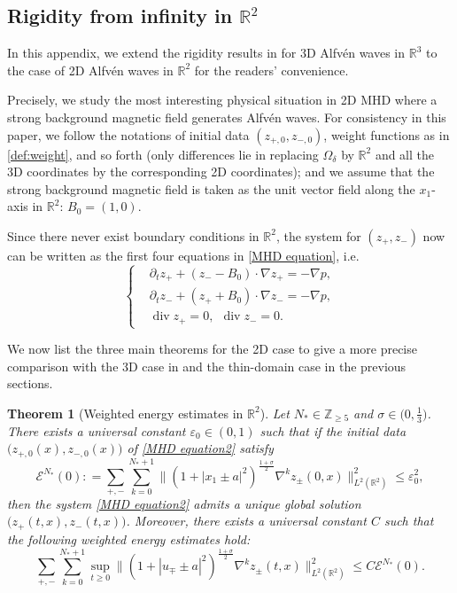 \documentclass[10pt,reqno]{amsart}
\numberwithin{equation}{section}
\newtheorem{theorem}{Theorem}[section]
\begin{document}
\begin{appendix}
	\section{Rigidity from infinity in $\mathbb{R}^2$}
	
	In this appendix, we extend the rigidity results in \cite{Li-Yu} for 3D Alfv\'en waves in $\mathbb{R}^3$  to the case of 2D Alfv\'en waves in $\mathbb{R}^2$ for the readers' convenience. 
	
	Precisely, we study the most interesting physical situation in 2D MHD where a strong background magnetic field generates Alfv\'en waves. For consistency in 
	this paper, we follow the notations of initial data $(z_{+,0},z_{-,0})$, weight functions as in \eqref{def:weight}, and so forth (only differences lie  in replacing $\Omega_\delta$ by $\mathbb{R}^2$ and all the 3D coordinates by the corresponding 2D coordinates); and we  
	assume that the strong background  magnetic field is taken as the unit vector field along the $x_1$-axis in $\mathbb{R}^2$: $B_0=(1,0)$.  
	
	Since there never exist boundary conditions in $\mathbb{R}^2$, the system for $(z_+,z_-)$ now can be written as the first four equations in \eqref{MHD equation}, i.e. 
	\begin{equation}\label{MHD equation2}\begin{cases}
			&\partial_{t}z_{+}+(z_--B_0)\cdot \nabla z_{+} =-\nabla p,\\
			&\partial_{t}z_{-}+(z_++B_0)\cdot \nabla z_{-} =-\nabla p,\\
			&\operatorname{div} z_{+}=0,\ \
			\operatorname{div} z_{-}=0.
	\end{cases}\end{equation}
	
We now list the three main theorems for the 2D case to give a more precise comparison with the 3D case in \cite{Li-Yu} and the thin-domain case in the previous sections.
	\begin{theorem}[Weighted energy estimates in $\mathbb{R}^2$]\label{Main Energy Estimates MHD 2d}  Let $N_* \in \mathbb{Z}_{\geqslant 5}$ and $\sigma \in\big(0,\frac{1}{3}\big)$. There exists a universal constant $\varepsilon_0\in(0,1)$ such that if the initial data $\big(z_{+,0}(x),z_{-,0}(x)\big)$ of \eqref{MHD equation2} satisfy
		\begin{equation*}
			\mathcal{E}^{N_*}(0): =\sum_{+,-}\sum_{k=0}^{N_*+1}\Big\|\left(1+|x_1\pm a|^2\right)^{\frac{1+\sigma}{2}}\nabla^{k} z_{\pm}(0,x)\Big\|_{L^2(\mathbb{R}^2)}^2\leqslant\varepsilon_0^2,
		\end{equation*}
		then the system \eqref{MHD equation2} admits a unique global solution  $\big(z_+(t,x),z_-(t,x)\big)$. Moreover, there exists a universal constant $C$ such that the following weighted energy estimates hold:
		\begin{equation*}
			\sum_{+,-}\sum_{k=0}^{N_*+1}\sup_{t\geqslant 0}\Big\|\left(1+|u_\mp \pm a|^2\right)^{\frac{1+\sigma}{2}}\nabla^{k}z_{\pm}(t,x)\Big\|_{L^2(\mathbb{R}^2)}^2 \leqslant C \mathcal{E}^{N_*}(0).
		\end{equation*}
	\end{theorem}
	


\end{appendix}
\end{document}
